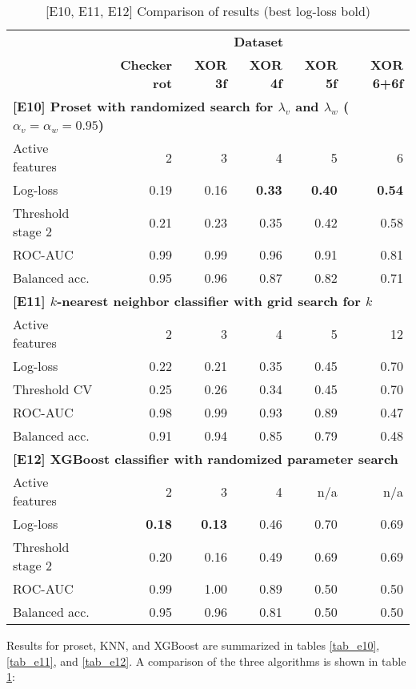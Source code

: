%
\begin{table}
\caption{[E10, E11, E12] Comparison of results (best log-loss bold)}
\label{tab_e10_e11_e12}
%
\begin{center}
\small
\begin{tabular}{|lrrrrr|}
\hline
&\multicolumn{5}{c|}{\textbf{\hrulefill\ Dataset \hrulefill}}\\
&\textbf{Checker rot}&\textbf{XOR 3f}&\textbf{XOR 4f}&\textbf{XOR 5f}&\textbf{XOR 6+6f}\\
\multicolumn{6}{|l|}{\textbf{[E10] Proset with randomized search for $\lambda_v$ and $\lambda_w$ ($\alpha_v=\alpha_w=0.95$)}}\\
Active features&2&3&4&5&6\\
Log-loss&0.19&0.16&\textbf{0.33}&\textbf{0.40}&\textbf{0.54}\\
Threshold stage 2&0.21&0.23&0.35&0.42&0.58\\
ROC-AUC&0.99&0.99&0.96&0.91&0.81\\
Balanced acc.&0.95&0.96&0.87&0.82&0.71\\
\multicolumn{6}{|l|}{\textbf{[E11] $k$-nearest neighbor classifier with grid search for $k$}}\\
Active features&2&3&4&5&12\\
Log-loss&0.22&0.21&0.35&0.45&0.70\\
Threshold CV&0.25&0.26&0.34&0.45&0.70\\
ROC-AUC&0.98&0.99&0.93&0.89&0.47\\
Balanced acc.&0.91&0.94&0.85&0.79&0.48\\
\multicolumn{6}{|l|}{\textbf{[E12] XGBoost classifier with randomized parameter search}}\\
Active features&2&3&4&n/a&n/a\\
Log-loss&\textbf{0.18}&\textbf{0.13}&0.46&0.70&0.69\\
Threshold stage 2&0.20&0.16&0.49&0.69&0.69\\
ROC-AUC&0.99&1.00&0.89&0.50&0.50\\
Balanced acc.&0.95&0.96&0.81&0.50&0.50\\
\hline
\end{tabular}
\end{center}
\end{table}
%
Results for proset, KNN, and XGBoost are summarized in tables \ref{tab_e10}, \ref{tab_e11}, and \ref{tab_e12}.
A comparison of the three algorithms is shown in table \ref{tab_e10_e11_e12}:
%
